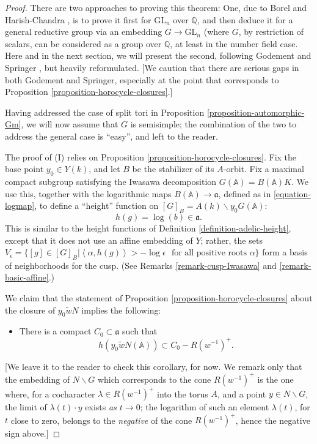 \begin{proof}
There are two approaches to proving this theorem: One, due to Borel and Harish-Chandra \cite{Borel-HC}, is to prove it first for $\text{GL}_n$ over $\mathbb Q$, and then deduce it for a general reductive group via an embedding $G\to \text{GL}_n$ (where $G$, by restriction of scalars, can be considered as a group over $\mathbb Q$, at least in the number field case. Here and in the next section, we will present the second, following Godement \cite{Godement-domaines-fondamentaux} and Springer \cite{Springer-reduction-theory}, but heavily reformulated. [We caution that there are serious gaps in both Godement and Springer, especially at the point that corresponds to Proposition \ref{proposition-horocycle-closures}.]

Having addressed the case of split tori in Proposition \ref{proposition-automorphic-Gm}, we will now assume that $G$ is semisimple; the combination of the two to address the general case is ``easy'', and left to the reader. 



The proof of (I) relies on Proposition \ref{proposition-horocycle-closures}.  Fix the base point $y_0\in Y(k)$, and let $B$ be the stabilizer of its $A$-orbit. Fix a maximal compact subgroup satisfying the Iwasawa decomposition $G(\mathbb A) = B(\mathbb A) K$. We use this, together with the logarithmic maps $B(\mathbb A)\to \mathfrak a$, defined as in \eqref{equation-logmap}, to define a ``height'' function  on $[G]_B = A(k)\backslash y_0 G(\mathbb A)$:
$$h(g) = \log(b)\in \mathfrak a.$$ 
This is similar to the height functions of Definition \ref{definition-adelic-height}, except that it does not use an affine embedding of $Y$; rather, the sets $V_\epsilon = \{ [g] \in [G]_B| \left < \alpha, h(g) \right > > -\log \epsilon \,\, \mbox{ for all positive roots } \alpha\}$ form a basis of neighborhoods for the cusp. (See Remarks  \ref{remark-cusp-Iwasawa} and \ref{remark-basic-affine}.)

We claim that the statement of Proposition \ref{proposition-horocycle-closures} about the closure of $y_0 \tilde w N$ implies the following:

\begin{itemize}
 \item There is a compact $C_0\subset \mathfrak a$ such that 
\begin{equation}
 \label{equation-bound-height}
h(y_0 \tilde w N(\mathbb A)) \subset C_0 - R(w^{-1})^+.
\end{equation}
\end{itemize}
[We leave it to the reader to check this corollary, for now. We remark only that the embedding of $N\backslash G$ which corresponds to the cone $R(w^{-1})^+$ is the one where, for a cocharacter $\lambda\in R(w^{-1})^+$ into the torus $A$, and a point $y\in N\backslash G$, the limit of $\lambda(t)\cdot y$ exists \emph{as $t\to 0$}; the logarithm of such an element $\lambda(t)$, for $t$ close to zero, belongs to the \emph{negative} of the cone $R(w^{-1})^+$, hence the negative sign above.]



\end{proof}
